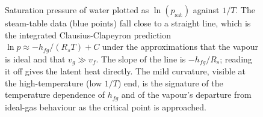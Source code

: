 \begin{figure}[htbp]
\centering
{}
\caption[Clausius-Clapeyron plot for water]{Saturation pressure of water
plotted as $\ln(p_{\text{sat}})$ against $1/T$. The steam-table data
(blue points) fall close to a straight line, which is the integrated
Clausius-Clapeyron prediction $\ln p \approx -h_{fg}/(R_s T) + C$ under
the approximations that the vapour is ideal and that $v_g\gg v_f$. The
slope of the line is $-h_{fg}/R_s$; reading it off gives the latent heat
directly. The mild curvature, visible at the high-temperature (low
$1/T$) end, is the signature of the temperature dependence of $h_{fg}$
and of the vapour's departure from ideal-gas behaviour as the critical
point is approached.}
\label{fig:vol04ch02:clausius-clapeyron}
\end{figure}

